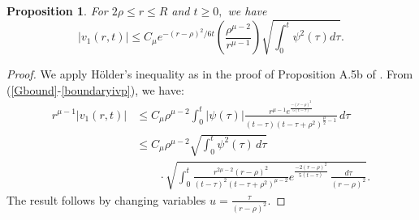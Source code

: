 \documentclass[12pt]{amsart}
\newtheorem{prop}[thm]{Proposition}
\theoremstyle{others}
\numberwithin{equation}{section}
\begin{document}
\begin{prop}\label{innerestimate} For $2\rho \leq r \leq R$ and $t \geq 0,$ we have
\begin{equation*}
| v_1(r,t) | \leq C_\mu e^{-(r - \rho)^2/6t} \left( \frac{\rho^{ \mu - 2 }}{r^{\mu - 1}} \right) \sqrt{ \int_0^t \psi^2(\tau) d\tau }.
\end{equation*}
\end{prop}
\begin{proof} We apply H\"older's inequality as in the proof of Proposition A.5b of \cite{lte}. From (\ref{Gbound}-\ref{boundaryivp}), we have:
\begin{equation*}
\begin{split}
r^{\mu - 1} |v_1(r,t)| & \leq C_\mu \rho^{ \mu  - 2} \int_0^t |\psi(\tau)| \frac{ r^{\mu - 1} e^{\frac{-(r -\rho)^2}{5(t - \tau)} }}{(t - \tau)(t - \tau + \rho^2)^{\frac{\mu}{2} - 1}} \, d\tau \\
& \leq C_\mu \rho^{ \mu - 2} \sqrt{\int_0^t \psi^2(\tau) \, d\tau } \\
& \qquad \cdot \sqrt{ \int_0^t \frac{r^{2\mu-2}(r - \rho)^2 }{(t - \tau)^2(t - \tau + \rho^2)^{\mu - 2} } e^{\frac{-2(r -\rho)^2}{5(t - \tau)} } \, \frac{d\tau}{(r - \rho)^2} }.
\end{split}
\end{equation*}
The result follows by changing variables $u = \frac{\tau}{(r  - \rho)^2}.$ %
\end{proof}








\end{document}
